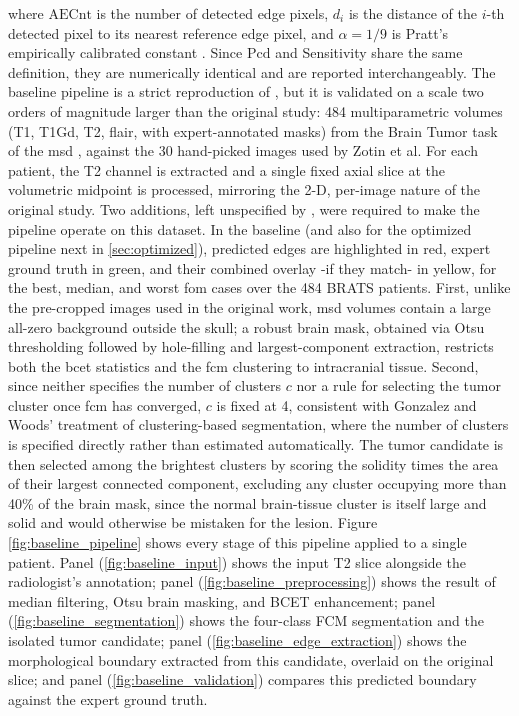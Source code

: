 where $\mathrm{AECnt}$ is the number of detected edge pixels, $d_i$ is the distance of the $i$-th detected pixel to its nearest reference edge pixel, and $\alpha=1/9$ is Pratt's empirically calibrated constant \cite{pratt1979quantitative}. Since $\mathrm{Pcd}$ and Sensitivity share the same definition, they are numerically identical and are reported interchangeably. The baseline pipeline is a strict reproduction of \cite{zotin2018edge}, but it is validated on a scale two orders of magnitude larger than the original study: 484 multiparametric volumes (T1, T1Gd, T2, \gls{flair}, with expert-annotated masks) from the Brain Tumor task of the \gls{msd} \cite{antonelli2022medical}, against the 30 hand-picked images used by Zotin et al. For each patient, the T2 channel is extracted and a single fixed axial slice at the volumetric midpoint is processed, mirroring the 2-D, per-image nature of the original study. Two additions, left unspecified by \cite{zotin2018edge}, were required to make the pipeline operate on this dataset. In the baseline (and also for the optimized pipeline next in \ref{sec:optimized}), predicted edges are highlighted in red, expert ground truth in green, and their combined overlay -if they match- in yellow, for the best, median, and worst \gls{fom} cases over the 484 BRATS patients. First, unlike the pre-cropped images used in the original work, \gls{msd} volumes contain a large all-zero background outside the skull; a robust brain mask, obtained via Otsu thresholding followed by hole-filling and largest-component extraction, restricts both the \gls{bcet} statistics and the \gls{fcm} clustering to intracranial tissue. Second, since \cite{zotin2018edge} neither specifies the number of clusters $c$ nor a rule for selecting the tumor cluster once \gls{fcm} has converged, $c$ is fixed at 4, consistent with Gonzalez and Woods' treatment of clustering-based segmentation, where the number of clusters is specified directly rather than estimated automatically. The tumor candidate is then selected among the brightest clusters by scoring the solidity times the area of their largest connected component, excluding any cluster occupying more than 40\% of the brain mask, since the normal brain-tissue cluster is itself large and solid and would otherwise be mistaken for the lesion. Figure \ref{fig:baseline_pipeline} shows every stage of this pipeline applied to a single patient. Panel (\ref{fig:baseline_input}) shows the input T2 slice alongside the radiologist's annotation; panel (\ref{fig:baseline_preprocessing}) shows the result of median filtering, Otsu brain masking, and BCET enhancement; panel (\ref{fig:baseline_segmentation}) shows the four-class FCM segmentation and the isolated tumor candidate; panel (\ref{fig:baseline_edge_extraction}) shows the morphological boundary extracted from this candidate, overlaid on the original slice; and panel (\ref{fig:baseline_validation}) compares this predicted boundary against the expert ground truth.
